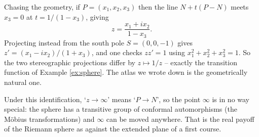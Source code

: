 \documentclass[a4paper]{scrartcl}
\begin{document}
\begin{center}
\end{center}

Chasing the geometry, if $P = (x_1,x_2,x_3)$ then the line $N + t(P - N)$ meets $x_3 = 0$
at $t = 1/(1-x_3)$, giving
$$
z = \frac{x_1 + i x_2}{1 - x_3}.
$$
Projecting instead from the south pole $S = (0,0,-1)$ gives $z' = (x_1 - ix_2)/(1 + x_3)$,
and one checks $z z' = 1$ using $x_1^2 + x_2^2 + x_3^2 = 1$. So the two stereographic
projections differ by $z \mapsto 1/z$ -- exactly the transition function of Example
\ref{ex:sphere}. The atlas we wrote down is the geometrically natural one.

\begin{remark}
	Under this identification, `$z \to \infty$' means `$P \to N$', so the point $\infty$
	is in no way special: the sphere has a transitive group of conformal automorphisms
	(the M\"obius transformations) and $\infty$ can be moved anywhere. That is the real
	payoff of the Riemann sphere as against the extended plane of a first course.
\end{remark}
\end{document}
